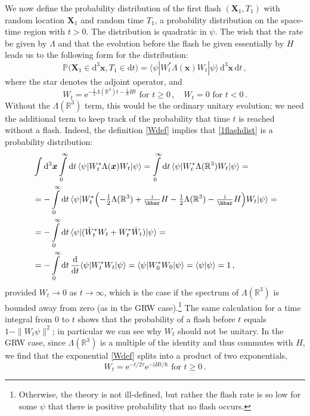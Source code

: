 \documentclass[12pt]{article}
\newcommand{\RRR}{\mathbb{R}}
\newcommand{\PPP}{\mathbb{P}}
\renewcommand{\sp}[2]{\langle #1 | #2 \rangle}
\newcommand{\vx}{\boldsymbol{x}}
\newcommand{\vX}{{\boldsymbol{X}}}
\newcommand{\D}{\mathrm{d}} %
\newcommand{\E}{\mathrm{e}} %
\newcommand{\I}{\mathrm{i}} %
\newcommand{\1}{1}
\begin{document}
We now define the probability distribution of the first flash $(\vX_1,T_1)$ with random location $\vX_1$ and random time $T_1$, a probability distribution on the space-time region with $t>0$. The distribution is quadratic in $\psi$. The wish that the rate be given by $\Lambda$ and that the evolution before the flash be given essentially by $H$ leads us to the following form for the distribution:
\begin{equation}\label{1flashdist}
  \PPP\bigl( \vX_1 \in \D^3 \vx, T_1 \in \D t \bigr) =
  \sp{\psi}{W_t^* \Lambda(\vx) W_t|\psi} \, \D^3\vx \, \D t \,,
\end{equation}
where the star denotes the adjoint operator, and 
\begin{equation}\label{Wdef}
  W_t = \E^{-\frac{1}{2} \Lambda(\RRR^3)t - \frac{\I}{\hbar} Ht} 
  \text{ for }t\geq 0\,, \quad W_t = 0 \text{ for } t<0 \,.
\end{equation}
Without the $\Lambda(\RRR^3)$ term, this would be the ordinary unitary evolution; we need the additional term to keep track of the probability that time $t$ is reached without a flash. Indeed, the definition \eqref{Wdef} implies that \eqref{1flashdist} is a probability distribution:
\begin{subequations}\label{calculation}
\begin{align}
  &\int\D^3 \vx \int\limits_0^\infty \D t \, \sp{\psi}{W_t^* \Lambda(\vx) W_t|\psi} =
  \int\limits_0^\infty \D t \, \sp{\psi}{W_t^* \Lambda(\RRR^3) W_t|\psi} = \\
  &= -\int\limits_0^\infty \D t \, \sp{\psi}{W_t^* \Bigl(- \tfrac{1}{2} \Lambda(\RRR^3) + 
  \tfrac{\I}{\hbar} H- \tfrac{1}{2} \Lambda(\RRR^3) - 
  \tfrac{\I}{\hbar} H \Bigr) W_t|\psi} =\\
  &= -\int\limits_0^\infty \D t \, \sp{\psi}{ (\dot{W}_t^* W_t + 
  W_t^* \dot{W}_t ) |\psi} =\\
  &= -\int\limits_0^\infty \D t \, \frac{\D}{\D t} \sp{\psi}{W_t^* W_t |\psi} =
  \sp{\psi}{W_0^* W_0|\psi} = \sp{\psi}{\psi} = 1 \,,
\end{align}
\end{subequations}
provided $W_t \to 0$ as $t \to \infty$, which is the case if the spectrum of $\Lambda(\RRR^3)$ is bounded away from zero  (as in the GRW case).\footnote{Otherwise, the theory is not ill-defined, but rather the flash rate is so low for some $\psi$ that there is positive probability that no flash occurs.} The same calculation for a time integral from 0 to $t$ shows that the probability of a flash before $t$ equals $1-\|W_t \psi\|^2$; in particular we can see why $W_t$ should not be unitary. In the GRW case, since $\Lambda(\RRR^3)$ is a multiple of the identity and thus commutes with $H$, we find that the exponential \eqref{Wdef} splits into a product of two exponentials,
\begin{equation}
  W_t = \E^{-t/2\tau} \E^{-\I Ht/\hbar} \text{ for }t \geq 0\,. 
\end{equation}
\end{document}
